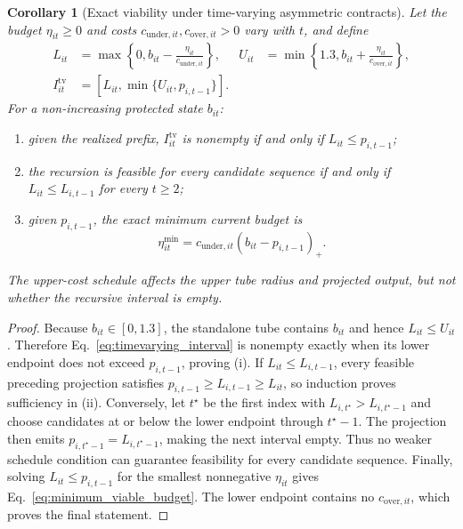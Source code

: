 \documentclass[11pt]{article}
\newtheorem{corollary}{Corollary}
\begin{document}
\begin{corollary}[Exact viability under time-varying asymmetric contracts]
\label{cor:timevarying}
Let the budget $\eta_{it}\geq0$ and costs $c_{\mathrm{under},it},c_{\mathrm{over},it}>0$ vary with $t$, and define
\begin{align}
  L_{it}&=\max\!\left\{0,b_{it}-\frac{\eta_{it}}{c_{\mathrm{under},it}}\right\},
  &
  U_{it}&=\min\!\left\{1.3,b_{it}+\frac{\eta_{it}}{c_{\mathrm{over},it}}\right\},
  \label{eq:timevarying_bounds}\\
  I^{\mathrm{tv}}_{it}&=[L_{it},\min\{U_{it},p_{i,t-1}\}].
  \label{eq:timevarying_interval}
\end{align}
For a non-increasing protected state $b_{it}$:
\begin{enumerate}[label=(\roman*),leftmargin=*]
  \item given the realized prefix, $I^{\mathrm{tv}}_{it}$ is nonempty if and only if $L_{it}\leq p_{i,t-1}$;
  \item the recursion is feasible for every candidate sequence if and only if $L_{it}\leq L_{i,t-1}$ for every $t\geq2$;
  \item given $p_{i,t-1}$, the exact minimum current budget is
  \begin{equation}
    \eta^{\min}_{it}
    =c_{\mathrm{under},it}(b_{it}-p_{i,t-1})_{+}.
    \label{eq:minimum_viable_budget}
  \end{equation}
\end{enumerate}
The upper-cost schedule affects the upper tube radius and projected output, but not whether the recursive interval is empty.
\end{corollary}
\begin{proof}
Because $b_{it}\in[0,1.3]$, the standalone tube contains $b_{it}$ and hence $L_{it}\leq U_{it}$. Therefore Eq.~\eqref{eq:timevarying_interval} is nonempty exactly when its lower endpoint does not exceed $p_{i,t-1}$, proving (i). If $L_{it}\leq L_{i,t-1}$, every feasible preceding projection satisfies $p_{i,t-1}\geq L_{i,t-1}\geq L_{it}$, so induction proves sufficiency in (ii). Conversely, let $t^{\star}$ be the first index with $L_{i,t^{\star}}>L_{i,t^{\star}-1}$ and choose candidates at or below the lower endpoint through $t^{\star}-1$. The projection then emits $p_{i,t^{\star}-1}=L_{i,t^{\star}-1}$, making the next interval empty. Thus no weaker schedule condition can guarantee feasibility for every candidate sequence. Finally, solving $L_{it}\leq p_{i,t-1}$ for the smallest nonnegative $\eta_{it}$ gives Eq.~\eqref{eq:minimum_viable_budget}. The lower endpoint contains no $c_{\mathrm{over},it}$, which proves the final statement.
\end{proof}
\end{document}
